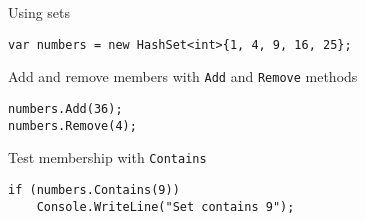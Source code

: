 \begin{frame}[fragile]{Using sets}
	\begin{lstlisting}
var numbers = new HashSet<int>{1, 4, 9, 16, 25};
	\end{lstlisting}
	\pause Add and remove members with \lstinline{Add} and \lstinline{Remove} methods
	\begin{lstlisting}
numbers.Add(36);
numbers.Remove(4);
	\end{lstlisting}
	\pause Test membership with \lstinline{Contains}
	\begin{lstlisting}
if (numbers.Contains(9))
    Console.WriteLine("Set contains 9");
	\end{lstlisting}
\end{frame}
